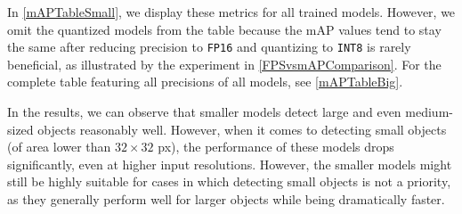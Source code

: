 In \autoref{mAPTableSmall}, we display these metrics for all trained models.
However, we omit the quantized models from the table because the mAP values tend
to stay the same after reducing precision to \texttt{FP16} and quantizing to
\texttt{INT8} is rarely beneficial, as illustrated by the experiment in
\autoref{FPSvsmAPComparison}. For the complete table featuring all precisions of
all models, see \autoref{mAPTableBig}.

In the results, we can observe that smaller models detect large and even
medium-sized objects reasonably well. However, when it comes to detecting small
objects (of area lower than $32 \times 32$ px), the performance of these models
drops significantly, even at higher input resolutions. However, the smaller
models might still be highly suitable for cases in which detecting small objects
is not a priority, as they generally perform well for larger objects while being
dramatically faster.

